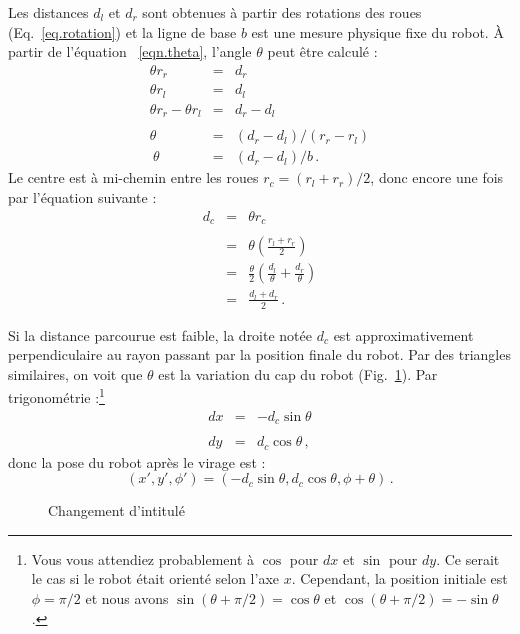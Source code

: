 Les distances $d_l$ et $d_r$ sont obtenues à partir des rotations des roues (Eq.~\ref{eq.rotation}) et la ligne de base $b$ est une mesure physique fixe du robot. À partir de l'équation ~\ref{eqn.theta}, l'angle $\theta$ peut être calculé :
\begin{eqnarray*}
\theta r_r &=& d_r\\
\theta r_l &=& d_l\\
\theta r_r - \theta r_l &=& d_r - d_l\\\\
\theta &=& (d_r - d_l) / (r_r - r_l)\\\
\theta &=& (d_r - d_l) / b\,.
\end{eqnarray*}
Le centre est à mi-chemin entre les roues $r_c =(r_l+r_r)/2$,
donc encore une fois par l'équation suivante :
\begin{eqnarray*}
d_c&=&\theta r_c\\\\\
&=&\theta \left(\frac{r_l+r_r}{2}\right)\\
&=&\frac{\theta}{2} \left(\frac{d_l}{\theta} + \frac{d_r}{\theta}\right)\\\
&=&\frac{d_l+d_r}{2}\,.
\end{eqnarray*}

Si la distance parcourue est faible, la droite notée $d_c$ est approximativement
perpendiculaire au rayon passant par la position finale du robot. Par des triangles similaires, on voit que $\theta$ est la variation du cap du robot (Fig.~\ref{fig.heading}). Par trigonométrie :\footnote{Vous vous attendiez probablement à $\cos$ pour $dx$ et $\sin$ pour $dy$. Ce serait le cas si le robot était orienté selon l'axe $x$. Cependant, la position initiale est $\phi=\pi/2$ et nous avons $\sin(\theta+\pi/2)=\cos\theta$ et $\cos(\theta+\pi/2)=-\sin\theta$.}
\begin{eqnarray*}
\textit{dx} &=& - d_c \sin \theta\\\\
\textit{dy} &=& d_c \cos \theta\,,
\end{eqnarray*}
donc la pose du robot après le virage est :
\[
(x',y',\phi') = ( - d_c \sin \theta, d_c \cos \theta, \phi+\theta)\,.
\]

\begin{figure}
\begin{center}
\end{center}
\caption{Changement d'intitulé}\label{fig.heading}
\end{figure}


